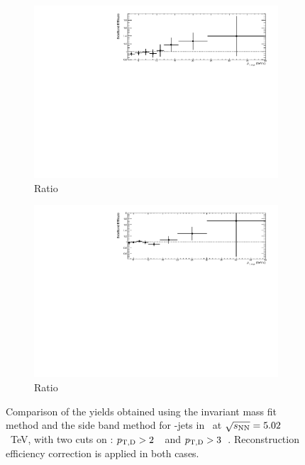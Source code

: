 \begin{figure}[bth]
\begin{subfigure}[b]{0.45\textwidth}
\includegraphics[width=\textwidth]{pPbplots/methodsComparison/DjetSpectraRatio_FASTwoSDD_eff_ptD2}
\caption{Ratio}
\end{subfigure}
\begin{subfigure}[b]{0.45\textwidth}
\includegraphics[width=\textwidth]{pPbplots/methodsComparison/DjetSpectraRatio_FASTwoSDD_eff_ptD3}
\caption{Ratio}
\end{subfigure}
\caption{Comparison of the yields obtained using the invariant mass fit method and the side band method for \Dstar-jets in \pPb\ at $\sqrt{s_{\rm NN}}=5.02$~TeV, with two cuts on \ptd: $p_{\mathrm{T,D}}>2$~\GeVc\ and $p_{\mathrm{T,D}}>3$~\GeVc.
Reconstruction efficiency correction is applied in both cases.}
\label{fig:JetPt_pPb_corrDrec}
\end{figure}


